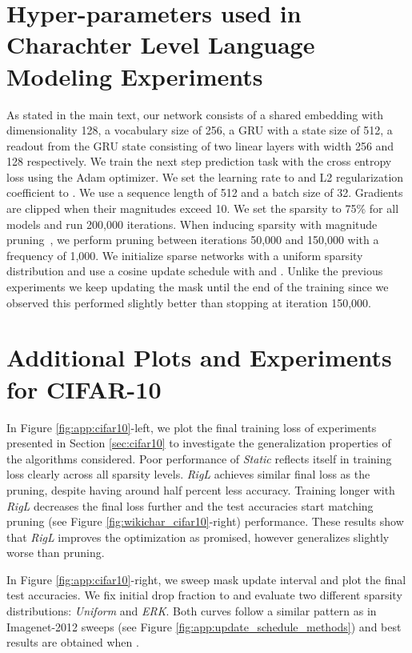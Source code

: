 \documentclass{article}
\begin{document}
\section{Hyper-parameters used in Charachter Level Language Modeling Experiments}
\label{app:chargru}
As stated in the main text, our network consists of a shared embedding with dimensionality 128, a vocabulary size of 256, a GRU with a state size of 512, a readout from the GRU state consisting of two linear layers with width 256 and 128 respectively.  We train the next step prediction task with the cross entropy loss using the Adam optimizer. We set the learning rate to  and L2 regularization coefficient to . We use a sequence length of 512 and a batch size of 32. Gradients are clipped when their magnitudes exceed 10. We set the sparsity to 75\% for all models and run 200,000 iterations.  When inducing sparsity with magnitude pruning~\citep{gupta2018}, we perform pruning between iterations 50,000 and 150,000 with a frequency of 1,000. We initialize sparse networks with a uniform sparsity distribution and use a cosine update schedule with  and . Unlike the previous experiments we keep updating the mask until the end of the training since we observed this performed slightly better than stopping at iteration 150,000.


\section{Additional Plots and Experiments for CIFAR-10}
\label{app:cifar10}
In Figure \ref{fig:app:cifar10}-left, we plot the final training loss of experiments presented in Section \ref{sec:cifar10} to investigate the generalization properties of the algorithms considered. Poor performance of \textit{Static} reflects itself in training loss clearly across all sparsity levels. \textit{RigL} achieves similar final loss as the pruning, despite having around half percent less accuracy. Training longer with \textit{RigL} decreases the final loss further and the test accuracies start matching pruning (see Figure \ref{fig:wikichar_cifar10}-right) performance. These results show that \textit{RigL} improves the optimization as promised, however generalizes slightly worse than pruning.

In Figure \ref{fig:app:cifar10}-right, we sweep mask update interval  and plot the final test accuracies. We fix initial drop fraction  to  and evaluate two different sparsity distributions: \textit{Uniform} and \textit{ERK}. Both curves follow a similar pattern as in Imagenet-2012 sweeps (see Figure \ref{fig:app:update_schedule_methods}) and best results are obtained when .
\end{document}
